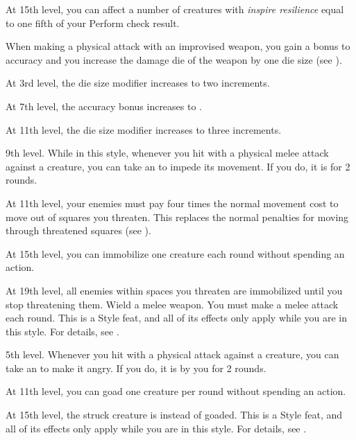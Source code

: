     At 15th level, you can affect a number of creatures with \textit{inspire resilience} equal to one fifth of your Perform check result.

    \featben When making a physical attack with an improvised weapon, you gain a  bonus to accuracy and you increase the damage die of the weapon by one die size (see ).

    At 3rd level, the die size modifier increases to two increments.

    At 7th level, the accuracy bonus increases to .

    At 11th level, the die size modifier increases to three increments.

    \featpre 9th level.
    \featben While in this style, whenever you hit with a physical melee attack against a creature, you can take an  to impede its movement.
    If you do, it is \immobilized for 2 rounds.

    At 11th level, your enemies must pay four times the normal movement cost to move out of squares you threaten.
    This replaces the normal penalties for moving through threatened squares (see ).

    At 15th level, you can immobilize one creature each round without spending an action.

    At 19th level, all enemies within spaces you threaten are immobilized until you stop threatening them.
    \stylereq Wield a melee weapon.
    You must make a melee attack each round.
     This is a Style feat, and all of its effects only apply while you are in this style.
    For details, see .

    \featpre 5th level.
    \featben Whenever you hit with a physical attack against a creature, you can take an  to make it angry.
    If you do, it is \goaded by you for 2 rounds.

    At 11th level, you can goad one creature per round without spending an action.

    At 15th level, the struck creature is \taunted instead of goaded.
     This is a Style feat, and all of its effects only apply while you are in this style.
    For details, see .

